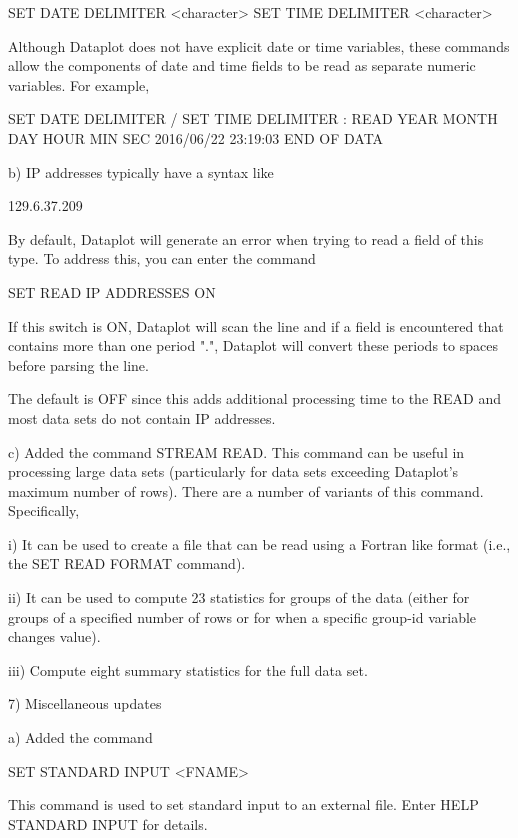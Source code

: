           SET DATE DELIMITER <character>
          SET TIME DELIMITER <character>

       Although Dataplot does not have explicit date or time variables,
       these commands allow the components of date and time fields to
       be read as separate numeric variables.  For example,

          SET DATE DELIMITER /
          SET TIME DELIMITER :
          READ YEAR MONTH DAY HOUR MIN SEC
          2016/06/22  23:19:03
          END OF DATA

    b) IP addresses typically have a syntax like

         129.6.37.209

       By default, Dataplot will generate an error when trying to read a
       field of this type.  To address this, you can enter the command

          SET READ IP ADDRESSES ON

       If this switch is ON, Dataplot will scan the line and if a field is
       encountered that contains more than one period ".", Dataplot will
       convert these periods to spaces before parsing the line.

       The default is OFF since this adds additional processing time to
       the READ and most data sets do not contain IP addresses.

    c) Added the command STREAM READ.  This command can be useful
       in processing large data sets (particularly for data sets
       exceeding Dataplot's maximum number of rows).  There are a
       number of variants of this command.  Specifically,

          i) It can be used to create a file that can be read
             using a Fortran like format (i.e., the SET READ
             FORMAT command).

         ii) It can be used to compute 23 statistics for groups
             of the data (either for groups of a specified number
             of rows or for when a specific group-id variable
             changes value).

        iii) Compute eight summary statistics for the full data
             set.

 7) Miscellaneous updates

    a) Added the command

          SET STANDARD INPUT <FNAME>

       This command is used to set standard input to an external
       file.  Enter HELP STANDARD INPUT for details.

